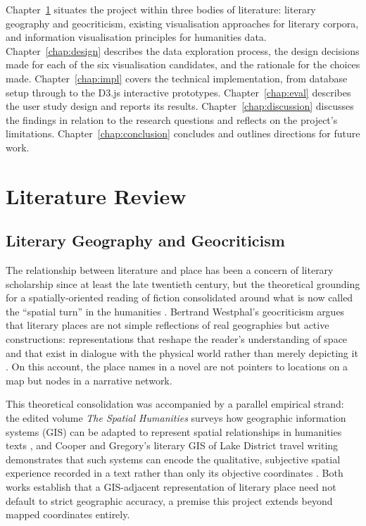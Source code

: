 \documentclass[logo,msc]{infthesis}
\begin{document}
Chapter~\ref{chap:lit} situates the project within three bodies of literature: literary geography and geocriticism, existing visualisation approaches for literary corpora, and information visualisation principles for humanities data. Chapter~\ref{chap:design} describes the data exploration process, the design decisions made for each of the six visualisation candidates, and the rationale for the choices made. Chapter~\ref{chap:impl} covers the technical implementation, from database setup through to the D3.js interactive prototypes. Chapter~\ref{chap:eval} describes the user study design and reports its results. Chapter~\ref{chap:discussion} discusses the findings in relation to the research questions and reflects on the project's limitations. Chapter~\ref{chap:conclusion} concludes and outlines directions for future work.
 
 
\chapter{Literature Review}
\label{chap:lit}
 
\section{Literary Geography and Geocriticism}
 
The relationship between literature and place has been a concern of literary scholarship since at least the late twentieth century, but the theoretical grounding for a spatially-oriented reading of fiction consolidated around what is now called the ``spatial turn'' in the humanities \cite{tally2013}. Bertrand Westphal's geocriticism argues that literary places are not simple reflections of real geographies but active constructions: representations that reshape the reader's understanding of space and that exist in dialogue with the physical world rather than merely depicting it \cite{westphal2011}. On this account, the place names in a novel are not pointers to locations on a map but nodes in a narrative network.
 
This theoretical consolidation was accompanied by a parallel empirical strand: the edited volume \emph{The Spatial Humanities} surveys how geographic information systems (GIS) can be adapted to represent spatial relationships in humanities texts \cite{bodenhamer2010}, and Cooper and Gregory's literary GIS of Lake District travel writing demonstrates that such systems can encode the qualitative, subjective spatial experience recorded in a text rather than only its objective coordinates \cite{cooper2011}. Both works establish that a GIS-adjacent representation of literary place need not default to strict geographic accuracy, a premise this project extends beyond mapped coordinates entirely.
\end{document}
